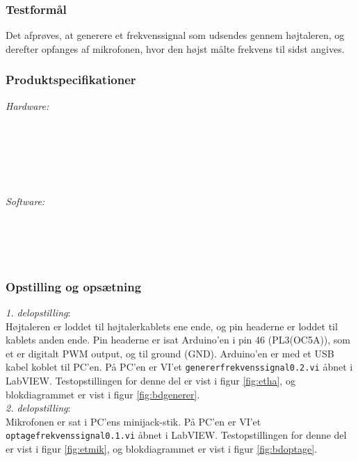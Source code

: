 		\subsubsection{Testformål}
		Det afprøves, at generere et frekvenssignal som udsendes gennem højtaleren, og derefter opfanges af mikrofonen, hvor den højst målte frekvens til sidst angives.  
		\subsubsection{Produktspecifikationer}
		
		\textit{Hardware:}\\
		\\
		\\
		\pins\\
		\arduino\\
		\PC\\
		\usbkabel\\
	
		\textit{Software:}\\
		\labview\\
		\visa\\
		\vi\\
		\ardsw\
		
		\subsubsection{Opstilling og opsætning}
		\textit{1. delopstilling}:\\
		Højtaleren er loddet til højtalerkablets ene ende, og pin headerne er loddet til kablets anden ende. 
		Pin headerne er isat Arduino'en i pin 46 (PL3(OC5A)), som et er digitalt PWM output, og til ground (GND). 
		Arduino'en er med et USB kabel koblet til PC'en. 		
		På PC'en er VI'et \texttt{genererfrekvenssignal0.2.vi} åbnet i LabVIEW. Testopstillingen for denne del er vist i figur \ref{fig:etha}, og blokdiagrammet er vist i figur \ref{fig:bdgenerer}.\\ 
 
		\textit{2. delopstilling}:\\
		Mikrofonen er sat i PC'ens minijack-stik. På PC'en er VI'et \texttt{optagefrekvenssignal0.1.vi} åbnet i LabVIEW. Testopstillingen for denne del er vist i figur \ref{fig:etmik}, og blokdiagrammet er vist i figur \ref{fig:bdoptage}.\\ 
		
